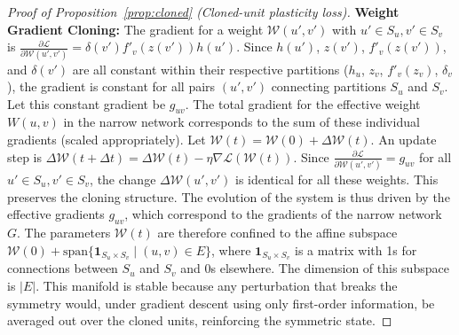 \documentclass{article}
\newcommand{\Loss}{\mathcal{L}}
\begin{document}
\begin{proof}[Proof of Proposition~\ref{prop:cloned} (Cloned-unit plasticity loss)]
    \textbf{Weight Gradient Cloning:} The gradient for a weight $\mathcal{W}(u', v')$ with $u' \in S_u, v' \in S_v$ is $\frac{\partial \Loss}{\partial \mathcal{W}(u', v')} = \delta(v') f'_v(z(v')) h(u')$. Since $h(u')$, $z(v')$, $f'_v(z(v'))$, and $\delta(v')$ are all constant within their respective partitions ($h_u$, $z_v$, $f'_v(z_v)$, $\delta_v$), the gradient is constant for all pairs $(u', v')$ connecting partitions $S_u$ and $S_v$. Let this constant gradient be $g_{uv}$.
    The total gradient for the effective weight $W(u,v)$ in the narrow network corresponds to the sum of these individual gradients (scaled appropriately).
    Let $\mathcal{W}(t) = \mathcal{W}(0) + \Delta\mathcal{W}(t)$. An update step is $\Delta\mathcal{W}(t+\Delta t) = \Delta\mathcal{W}(t) - \eta \nabla \Loss(\mathcal{W}(t))$. Since $\frac{\partial \Loss}{\partial \mathcal{W}(u', v')} = g_{uv}$ for all $u' \in S_u, v' \in S_v$, the change $\Delta\mathcal{W}(u', v')$ is identical for all these weights. This preserves the cloning structure. The evolution of the system is thus driven by the effective gradients $g_{uv}$, which correspond to the gradients of the narrow network $G$. The parameters $\mathcal{W}(t)$ are therefore confined to the affine subspace $\mathcal{W}(0) + \text{span}\{\mathbf{1}_{S_u \times S_v} \mid (u,v) \in E\}$, where $\mathbf{1}_{S_u \times S_v}$ is a matrix with 1s for connections between $S_u$ and $S_v$ and 0s elsewhere. The dimension of this subspace is $|E|$. This manifold is stable because any perturbation that breaks the symmetry would, under gradient descent using only first-order information, be averaged out over the cloned units, reinforcing the symmetric state.
\end{proof}
\end{document}
